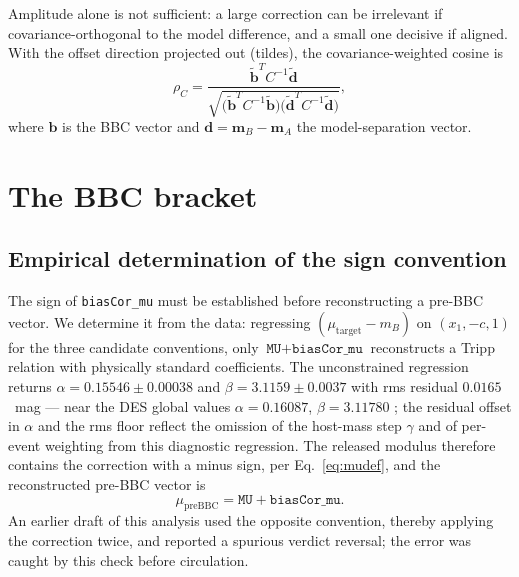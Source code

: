 \documentclass[11pt]{article}
\begin{document}
Amplitude alone is not sufficient: a large correction can be irrelevant if
covariance-orthogonal to the model difference, and a small one decisive if
aligned. With the offset direction projected out (tildes), the
covariance-weighted cosine is
\begin{equation}
\rho_C =
\frac{
    \widetilde{\boldsymbol b}^{T} C^{-1} \widetilde{\boldsymbol d}
}{
    \sqrt{
        \bigl(\widetilde{\boldsymbol b}^{T} C^{-1}
              \widetilde{\boldsymbol b}\bigr)
        \bigl(\widetilde{\boldsymbol d}^{T} C^{-1}
              \widetilde{\boldsymbol d}\bigr)
    }
} ,
\label{eq:rho}
\end{equation}
where $\boldsymbol{b}$ is the BBC vector and
$\boldsymbol{d} = \boldsymbol{m}_B - \boldsymbol{m}_A$ the model-separation
vector.

\section{The BBC bracket}
\label{sec:bracket}

\subsection{Empirical determination of the sign convention}
\label{sec:sign}

The sign of \texttt{biasCor\_mu} must be established before reconstructing
a pre-BBC vector. We determine it from the data: regressing
$(\mu_{\mathrm{target}} - m_B)$ on $(x_1, -c, 1)$ for the three candidate
conventions, only $\texttt{MU} + \texttt{biasCor\_mu}$ reconstructs a
Tripp relation \citep{Tripp1998} with physically standard coefficients.
The unconstrained regression returns $\alpha = 0.15546 \pm 0.00038$ and
$\beta = 3.1159 \pm 0.0037$ with rms residual $0.0165$~mag --- near the
DES global values $\alpha = 0.16087$, $\beta = 3.11780$
\citep{Vincenzi2024}; the residual offset in $\alpha$ and the rms floor
reflect the omission of the host-mass step $\gamma$ and of per-event
weighting from this diagnostic regression. The released modulus therefore
contains the correction with a minus sign, per Eq.~\eqref{eq:mudef}, and
the reconstructed pre-BBC vector is
\begin{equation}
\mu_{\mathrm{preBBC}} = \texttt{MU} + \texttt{biasCor\_mu} .
\label{eq:prebbc}
\end{equation}
An earlier draft of this analysis used the opposite convention, thereby
applying the correction twice, and reported a spurious verdict reversal;
the error was caught by this check before circulation.
\end{document}
